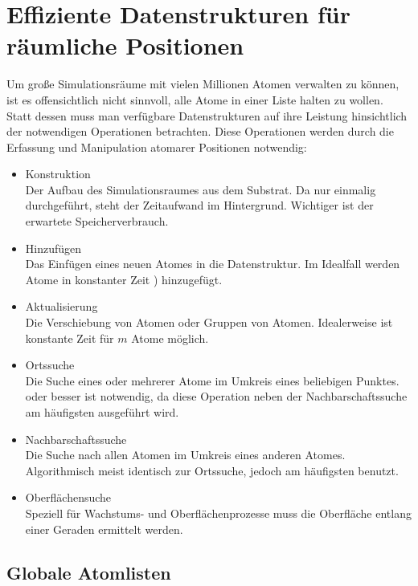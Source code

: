 \section{Effiziente Datenstrukturen für räumliche Positionen}

Um große Simulationsräume mit vielen Millionen Atomen verwalten zu können, ist es offensichtlich nicht sinnvoll, alle Atome in einer Liste halten zu wollen.
Statt dessen muss man verfügbare Datenstrukturen auf ihre Leistung hinsichtlich der notwendigen Operationen betrachten.
Diese Operationen werden durch die Erfassung und Manipulation atomarer Positionen notwendig:

\begin{itemize}
\item Konstruktion \\
Der Aufbau des Simulationsraumes aus dem Substrat. Da nur einmalig durchgeführt, steht der Zeitaufwand im Hintergrund. Wichtiger ist der erwartete Speicherverbrauch.
\item Hinzufügen \\
Das Einfügen eines neuen Atomes in die Datenstruktur. Im Idealfall werden Atome in konstanter Zeit ) hinzugefügt.
\item Aktualisierung \\
Die Verschiebung von Atomen oder Gruppen von Atomen. Idealerweise ist konstante Zeit  für $m$ Atome möglich.
\item Ortssuche \\
Die Suche eines oder mehrerer Atome im Umkreis eines beliebigen Punktes.  oder besser ist notwendig, da diese Operation neben der Nachbarschaftssuche am häufigsten ausgeführt wird.
\item Nachbarschaftssuche \\
Die Suche nach allen Atomen im Umkreis eines anderen Atomes. Algorithmisch meist identisch zur Ortssuche, jedoch am häufigsten benutzt.
\item Oberflächensuche \\
Speziell für Wachstums- und Oberflächenprozesse muss die Oberfläche entlang einer Geraden ermittelt werden.
\end{itemize}

\subsection{Globale Atomlisten}

